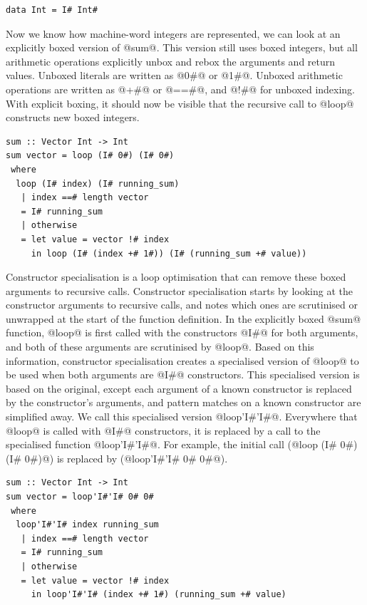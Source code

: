 \begin{lstlisting}
data Int = I# Int#
\end{lstlisting}

Now we know how machine-word integers are represented, we can look at an explicitly boxed version of @sum@.
This version still uses boxed integers, but all arithmetic operations explicitly unbox and rebox the arguments and return values.
Unboxed literals are written as @0#@ or @1#@.
Unboxed arithmetic operations are written as @+#@ or @==#@, and @!#@ for unboxed indexing.
With explicit boxing, it should now be visible that the recursive call to @loop@ constructs new boxed integers.

\begin{lstlisting}
sum :: Vector Int -> Int
sum vector = loop (I# 0#) (I# 0#)
 where
  loop (I# index) (I# running_sum)
   | index ==# length vector
   = I# running_sum
   | otherwise
   = let value = vector !# index
     in loop (I# (index +# 1#)) (I# (running_sum +# value))
\end{lstlisting}

Constructor specialisation \cite{peyton2007call} is a loop optimisation that can remove these boxed arguments to recursive calls.
Constructor specialisation starts by looking at the constructor arguments to recursive calls, and notes which ones are scrutinised or unwrapped at the start of the function definition.
In the explicitly boxed @sum@ function, @loop@ is first called with the constructors @I#@ for both arguments, and both of these arguments are scrutinised by @loop@.
Based on this information, constructor specialisation creates a specialised version of @loop@ to be used when both arguments are @I#@ constructors.
This specialised version is based on the original, except each argument of a known constructor is replaced by the constructor's arguments, and pattern matches on a known constructor are simplified away.
We call this specialised version @loop'I#'I#@.
Everywhere that @loop@ is called with @I#@ constructors, it is replaced by a call to the specialised function @loop'I#'I#@.
For example, the initial call (@loop (I# 0#) (I# 0#)@) is replaced by (@loop'I#'I# 0# 0#@).

\begin{lstlisting}
sum :: Vector Int -> Int
sum vector = loop'I#'I# 0# 0#
 where
  loop'I#'I# index running_sum
   | index ==# length vector
   = I# running_sum
   | otherwise
   = let value = vector !# index
     in loop'I#'I# (index +# 1#) (running_sum +# value)
\end{lstlisting}

